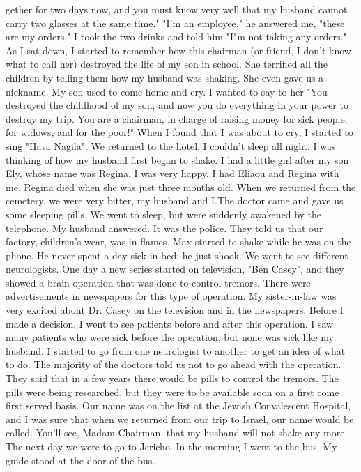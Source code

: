 gether for two days now, and you must know very well that my husband 
cannot carry two glasses at the same time."
"I'm an employee," he answered me, "these are my orders."
I took the two drinks and told him 
"I"m not taking any orders."
As I sat down, I started to remember how this chairman (or friend, I don't know what to call her) destroyed the life of my son in school.
She terrified all the children by telling them how my husband was shaking.
She even gave us a nickname.
My son used to come home and cry.
I wanted to say to her "You destroyed the childhood of my son, and now 
you do everything in your power to destroy my trip.
You are a chairman, in charge of raising money for sick people, for widows, and for the poor!"
When I found that I was about to cry, I started to sing "Hava Nagila".
We returned to the hotel.
I couldn't sleep all night.
I was thinking of how my husband first began to shake.
I had a little girl after my son Ely, whose name was Regina.
I was very happy.
I had Eliaou and Regina with me.
Regina died when she was just three months old.
When we returned from the cemetery, we were very bitter, my husband and 
I.The doctor came and gave us some sleeping pills.
We went to sleep, 
but were suddenly awakened by the telephone.
My husband answered.
It 
was the police.
They told us that our factory, children's wear, was in 
flames.
Max started to shake while he was on the phone.
He never spent a day sick in bed; he just shook.
We went to see 
different neurologists.
One day a new series started on television, 
"Ben Casey", and they showed a brain operation that was done to control 
tremors.
There were advertisements in newspapers for this type 
of operation.
My sister-in-law was very excited about Dr.
Casey on 
the television and in the newspapers.
Before I made a decision, I went 
to see patients before and after this operation.
I saw many patients 
who were sick before the operation, but none was sick like my husband.
I started to go from one neurologist to another to get an idea of what 
to do.
The majority of the doctors told us not to go ahead with 
the operation.
They said that in a few years there would be pills to 
control the tremors.
The pills were being researched, but they were to 
be available soon on a first come first served basis.
Our name was on 
the list at the Jewish Convalescent Hospital, and I was sure that when 
we returned from our trip to Israel, our name would be called.
You'll 
see, Madam Chairman, that my husband will not shake any more.
The next day we were to go to Jericho.
In the morning I went to
the bus.
My guide stood at the door of the bus.
